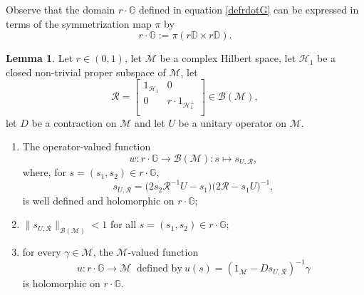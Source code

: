 \documentclass[12pt,reqno]{amsart}
\numberwithin{equation}{section}
\theoremstyle{definition}
\newtheorem{lem}[equation]{Lemma}
\begin{document}
Observe that the domain $r\cdot\mathbb{G}$ defined in equation \eqref{defrdotG} can be expressed in terms of the symmetrization map $\pi$ by
$$ r \cdot \mathbb{G}:=\pi(r\mathbb{D}\times r\mathbb{D}).$$

\begin{lem}\label{sURanalyticlemma} Let $r\in(0,1)$, let $\mathcal{M}$ be a complex Hilbert space, let   $\mathcal{H}_{1}$ be  a closed non-trivial proper subspace  of $\mathcal{M}$, let 
\begin{equation}\label{RonM}
\mathcal{R}=\begin{bmatrix}
	1_{\mathcal{H}_{1}  } 	& 0                \\
	0 		& r\cdot 1_{\mathcal{H}_{1}^{\perp}}  	\\
\end{bmatrix}\in\mathcal{B(M)},
\end{equation}
let $D$ be a contraction on $\mathcal{M}$ and let $U$ be a unitary operator on $\mathcal{M}$.
\begin{enumerate}
    \item The operator-valued function 
     $$w:r\cdot\mathbb{G}\rightarrow \mathcal{B(M)} : s\mapsto s_{U,\mathcal{R}},$$ 
where, 
for $s=(s_{1},s_{2})\in r\cdot\mathbb{G}$,
\begin{equation}\label{sUR-form}
s_{U,\mathcal{R}} = \bigg(2s_{2}\mathcal{R}^{-1}U-s_{1}\bigg)\bigg(2\mathcal{R}-s_{1}U\bigg)^{-1},
\end{equation}   
is well defined and holomorphic on $r\cdot\mathbb{G}$;
    \item $\|s_{U,\mathcal{R}}\|_{\mathcal{B(M)}}< 1$ for all $s=(s_{1},s_{2})\in r\cdot\mathbb{G}$;
    \item for every $\gamma\in\mathcal{M}$, the $\mathcal{M}$-valued function $$u:r\cdot\mathbb{G}\rightarrow \mathcal{M} \ \text{ defined by} \ u(s) = (1_{\mathcal{M}}-Ds_{U,\mathcal{R}})^{-1}\gamma$$ is holomorphic on $r\cdot\mathbb{G}$.
\end{enumerate}
\end{lem}
\end{document}
